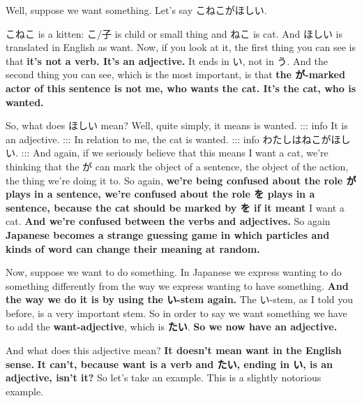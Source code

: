 \stopsectionlevel

\startsectionlevel[title={Expressing desire with ほしい},reference={expressing-desire-with-ほしい}]

Well, suppose we want something. Let's say こねこがほしい.

{}

こねこ is a kitten: こ/子 is child or small thing and ねこ is cat. And ほしい is translated in English as want. Now, if you look at it, the first thing you can see is that {\bf it's not a verb. It's an adjective.} It ends in い, not in う. And the second thing you can see, which is the most important, is that {\bf the が-marked actor of this sentence is not me, who wants the cat. It's the cat, who is wanted.}

{}

So, what does ほしい mean? Well, quite simply, it means is wanted. ::: info It is an adjective. ::: In relation to me, the cat is wanted. ::: info わたしはねこがほしい. ::: And again, if we seriously believe that this means I want a cat, we're thinking that the が can mark the object of a sentence, the object of the action, the thing we're doing it to. So again, {\bf we're being confused about the role が plays in a sentence, we're confused about the role を plays in a sentence, because the cat should be marked by を if it meant} I want a cat. {\bf And we're confused between the verbs and adjectives.} So again {\bf Japanese becomes a strange guessing game in which particles and kinds of word can change their meaning at random.}

\stopsectionlevel

\startsectionlevel[title={Expressing wanting to do something with たい},reference={expressing-wanting-to-do-something-with-たい}]

Now, suppose we want to do something. In Japanese we express wanting to do something differently from the way we express wanting to have something. {\bf And the way we do it is by using the い-stem again.} The い-stem, as I told you before, is a very important stem. So in order to say we want something we have to add the {\bf want-adjective}, which is {\bf たい}. {\bf So we now have an adjective.}

{}

And what does this adjective mean? {\bf It doesn't mean want in the English sense.} {\bf It can't, because want is a verb and たい, ending in い, is an adjective, isn't it?} So let's take an example. This is a slightly notorious example.

